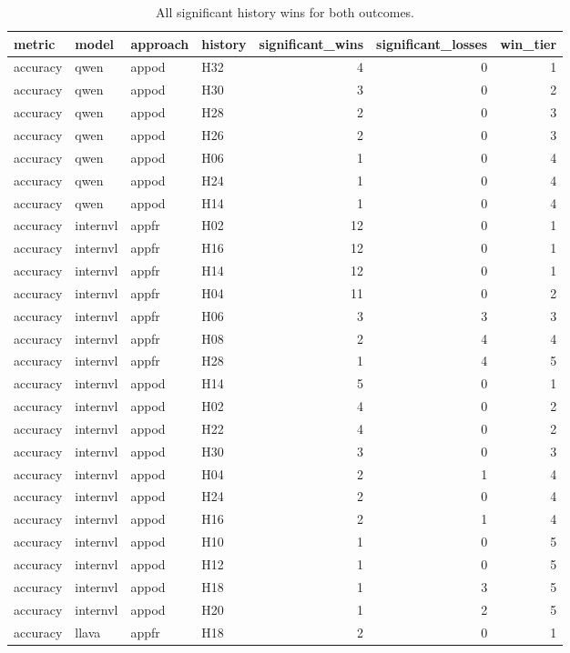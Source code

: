 \begin{table}[tbp]
\caption{All significant history wins for both outcomes.}
\label{tab:rq3-all-significant-history-wins}
\begin{tabular}{llllrrr}
\toprule
metric & model & approach & history & significant\_wins & significant\_losses & win\_tier \\
\midrule
accuracy & qwen & appod & H32 & 4 & 0 & 1 \\
accuracy & qwen & appod & H30 & 3 & 0 & 2 \\
accuracy & qwen & appod & H28 & 2 & 0 & 3 \\
accuracy & qwen & appod & H26 & 2 & 0 & 3 \\
accuracy & qwen & appod & H06 & 1 & 0 & 4 \\
accuracy & qwen & appod & H24 & 1 & 0 & 4 \\
accuracy & qwen & appod & H14 & 1 & 0 & 4 \\
accuracy & internvl & appfr & H02 & 12 & 0 & 1 \\
accuracy & internvl & appfr & H16 & 12 & 0 & 1 \\
accuracy & internvl & appfr & H14 & 12 & 0 & 1 \\
accuracy & internvl & appfr & H04 & 11 & 0 & 2 \\
accuracy & internvl & appfr & H06 & 3 & 3 & 3 \\
accuracy & internvl & appfr & H08 & 2 & 4 & 4 \\
accuracy & internvl & appfr & H28 & 1 & 4 & 5 \\
accuracy & internvl & appod & H14 & 5 & 0 & 1 \\
accuracy & internvl & appod & H02 & 4 & 0 & 2 \\
accuracy & internvl & appod & H22 & 4 & 0 & 2 \\
accuracy & internvl & appod & H30 & 3 & 0 & 3 \\
accuracy & internvl & appod & H04 & 2 & 1 & 4 \\
accuracy & internvl & appod & H24 & 2 & 0 & 4 \\
accuracy & internvl & appod & H16 & 2 & 1 & 4 \\
accuracy & internvl & appod & H10 & 1 & 0 & 5 \\
accuracy & internvl & appod & H12 & 1 & 0 & 5 \\
accuracy & internvl & appod & H18 & 1 & 3 & 5 \\
accuracy & internvl & appod & H20 & 1 & 2 & 5 \\
accuracy & llava & appfr & H18 & 2 & 0 & 1 \\

\end{tabular}
\end{table}
